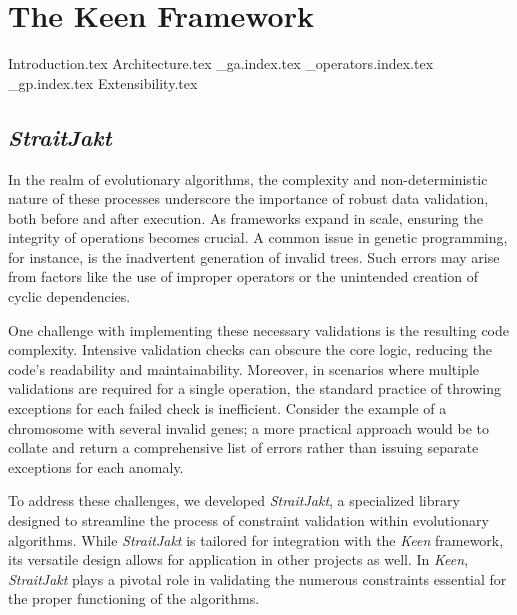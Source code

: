 
\chapter{The Keen Framework}
\label{chap:keen}
    {Introduction.tex}
    {Architecture.tex}
    {_ga.index.tex}
    {_operators.index.tex}
    {_gp.index.tex}
    {Extensibility.tex}

    \section{\textit{StraitJakt}}
        In the realm of evolutionary algorithms, the complexity and non-deterministic nature of these processes 
        underscore the importance of robust data validation, both before and after execution. As frameworks expand in 
        scale, ensuring the integrity of operations becomes crucial. A common issue in genetic programming, for 
        instance, is the inadvertent generation of invalid trees. Such errors may arise from factors like the use of 
        improper operators or the unintended creation of cyclic dependencies.

        One challenge with implementing these necessary validations is the resulting code complexity. Intensive 
        validation checks can obscure the core logic, reducing the code's readability and maintainability. Moreover, in 
        scenarios where multiple validations are required for a single operation, the standard practice of throwing 
        exceptions for each failed check is inefficient. Consider the example of a chromosome with several invalid 
        genes; a more practical approach would be to collate and return a comprehensive list of errors rather than 
        issuing separate exceptions for each anomaly.

        To address these challenges, we developed \textit{StraitJakt}, a specialized library designed to streamline the 
        process of constraint validation within evolutionary algorithms. While \textit{StraitJakt} is tailored for 
        integration with the \textit{Keen} framework, its versatile design allows for application in other projects as 
        well. In \textit{Keen}, \textit{StraitJakt} plays a pivotal role in validating the numerous constraints 
        essential for the proper functioning of the algorithms. 

